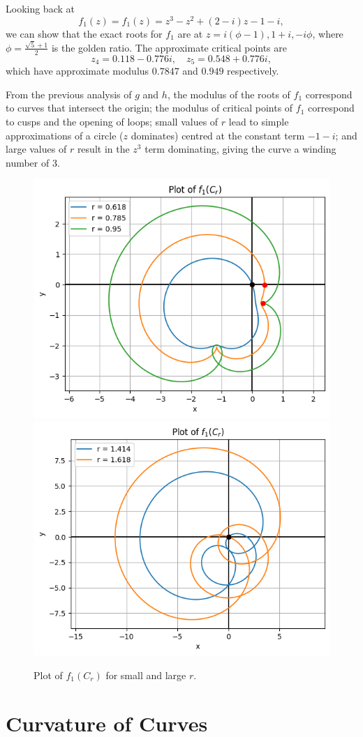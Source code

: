 \documentclass{article}
\begin{document}
Looking back at 
\[ f_1(z) = f_1(z) = z^3 - z^2 + (2 - i)z - 1 - i, \]
we can show that the exact roots for \(f_1\) are at \(z = i(\phi-1), 1+i, -i\phi\), where \(\phi = \frac{\sqrt{5} + 1}{2}\) is the golden ratio. The approximate critical points are
\[ z_4 = 0.118 - 0.776i, \quad z_5 = 0.548 + 0.776i, \]
which have approximate modulus \(0.7847\) and \(0.949\) respectively. 

From the previous analysis of \(g\) and \(h\), the modulus of the roots of \(f_1\) correspond to curves that intersect the origin; the modulus of critical points of \(f_1\) correspond to cusps and the opening of loops; small values of \(r\) lead to simple approximations of a circle (\(z\) dominates) centred at the constant term \(-1 - i\); and large values of \(r\) result in the \(z^3\) term dominating, giving the curve a winding number of \(3\).

\begin{figure}
    \centering
    \includegraphics[width=0.49\linewidth]{images/fsmallr.png}
    \includegraphics[width=0.49\linewidth]{images/flarger.png}
    \caption{Plot of \(f_1(C_r)\) for small and large \(r\).}
\end{figure}

\section{Curvature of Curves}
\end{document}
